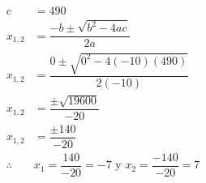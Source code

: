 \begin{solutionbox}{10.5cm}
\begin{multicols}{2}
\[\begin{array}{rl}
                c          & =490                                                          \\
                x_{1,2}    & = \dfrac{-b\pm\sqrt{b^2-4ac}}{2a}                             \\[2em]
                x_{1,2}    & = \dfrac{0\pm\sqrt{0^2-4(-10)(490)}}{2(-10)}                  \\[2em]
                x_{1,2}    & = \dfrac{\pm\sqrt{19600}}{-20}                                \\[2em]
                x_{1,2}    & = \dfrac{\pm140}{-20}                                         \\[2em]
                \therefore & x_1 =\dfrac{140}{-20}=-7 \text{ y }  x_2 =\dfrac{-140}{-20}=7 \\[2em]
            \end{array}
        \]
    \end{multicols}
\end{solutionbox}

